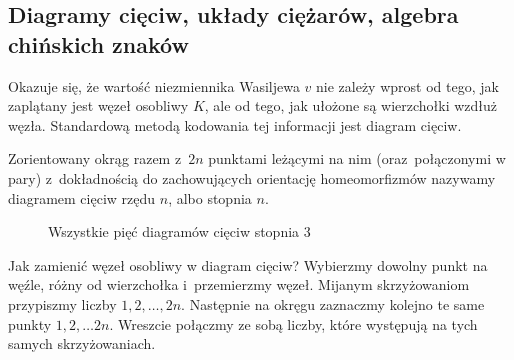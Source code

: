 
\subsection{Diagramy cięciw, układy ciężarów, algebra chińskich znaków}

Okazuje się, że wartość niezmiennika Wasiljewa $v$ nie zależy wprost od tego, jak zaplątany jest węzeł osobliwy $K$, ale od tego, jak ułożone są wierzchołki wzdłuż węzła.
Standardową metodą kodowania tej informacji jest diagram cięciw.

\begin{definition}
%
    Zorientowany okrąg razem z~$2n$ punktami leżącymi na nim (oraz~połączonymi w pary) z~dokładnością do zachowujących orientację homeomorfizmów nazywamy diagramem cięciw rzędu $n$, albo stopnia $n$.
\end{definition}

\begin{figure}[H]
    \centering
\begin{comment}
    \begin{minipage}[b]{.18\linewidth}
        \[\LargeChordDiagramA\]
        \subcaption{}
    \end{minipage}
    \begin{minipage}[b]{.18\linewidth}
        \[\LargeChordDiagramB\]
        \subcaption{}
    \end{minipage}
    \begin{minipage}[b]{.18\linewidth}
        \[\LargeChordDiagramC\]
        \subcaption{}
    \end{minipage}
    \begin{minipage}[b]{.18\linewidth}
        \[\LargeChordDiagramD\]
        \subcaption{}
    \end{minipage}
    \begin{minipage}[b]{.18\linewidth}
        \[\LargeChordDiagramE\]
        \subcaption{}
    \end{minipage}
\end{comment}
    \caption{Wszystkie pięć diagramów cięciw stopnia 3}
\end{figure}

Jak zamienić węzeł osobliwy w diagram cięciw?
Wybierzmy dowolny punkt na węźle, różny od wierzchołka i~przemierzmy węzeł.
Mijanym skrzyżowaniom przypiszmy liczby $1, 2, \ldots, 2n$.
Następnie na okręgu zaznaczmy kolejno te same punkty $1, 2, \ldots 2n$.
Wreszcie połączmy ze sobą liczby, które występują na tych samych skrzyżowaniach.

